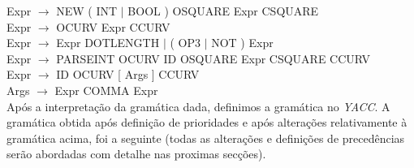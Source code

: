\documentclass[11pt,a4paper]{article}
\begin{document}
\vspace{.5cm}Expr $\rightarrow$ NEW ( INT $\mid$ BOOL ) OSQUARE Expr CSQUARE\\
\vspace{.5cm}Expr $\rightarrow$ OCURV Expr CCURV\\
\vspace{.5cm}Expr $\rightarrow$ Expr DOTLENGTH $\mid$ ( OP3 $\mid$ NOT ) Expr\\
\vspace{.5cm}Expr $\rightarrow$ PARSEINT OCURV ID OSQUARE Expr CSQUARE CCURV\\
\vspace{.5cm}Expr $\rightarrow$ ID OCURV [ Args ] CCURV\\
\vspace{.5cm}Args $\rightarrow$ Expr { COMMA Expr }\\


Após a interpretação da gramática dada, definimos a gramática no \textit{YACC}. A gramática obtida após definição de prioridades e após alterações relativamente à gramática acima, foi a seguinte (todas as alterações e definições de precedências serão abordadas com detalhe nas proximas secções).

\vspace{0.7cm}
\end{document}
